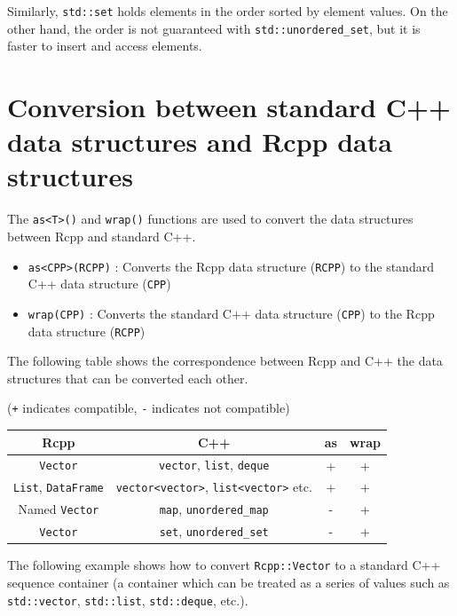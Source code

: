 \documentclass[
]{book}
\providecommand{\tightlist}{%
  \setlength{\itemsep}{0pt}\setlength{\parskip}{0pt}}
\begin{document}
Similarly, \texttt{std::set} holds elements in the order sorted by element values. On the other hand, the order is not guaranteed with \texttt{std::unordered\_set}, but it is faster to insert and access elements.

\hypertarget{conversion-between-standard-c-data-structures-and-rcpp-data-structures}{%
\section{Conversion between standard C++ data structures and Rcpp data structures}\label{conversion-between-standard-c-data-structures-and-rcpp-data-structures}}

The \texttt{as\textless{}T\textgreater{}()} and \texttt{wrap()} functions are used to convert the data structures between Rcpp and standard C++.

\begin{itemize}
\tightlist
\item
  \texttt{as\textless{}CPP\textgreater{}(RCPP)} : Converts the Rcpp data structure (\texttt{RCPP}) to the standard C++ data structure (\texttt{CPP})
\item
  \texttt{wrap(CPP)} : Converts the standard C++ data structure (\texttt{CPP}) to the Rcpp data structure (\texttt{RCPP})
\end{itemize}

The following table shows the correspondence between Rcpp and C++ the data structures that can be converted each other.

(\texttt{+} indicates compatible, \texttt{-} indicates not compatible)

\begin{longtable}[]{@{}cccc@{}}
\toprule
Rcpp & C++ & as & wrap\tabularnewline
\midrule
\endhead
\texttt{Vector} & \texttt{vector}, \texttt{list}, \texttt{deque} & + & +\tabularnewline
\texttt{List}, \texttt{DataFrame} & \texttt{vector\textless{}vector\textgreater{}}, \texttt{list\textless{}vector\textgreater{}} etc. & + & +\tabularnewline
Named \texttt{Vector} & \texttt{map}, \texttt{unordered\_map} & - & +\tabularnewline
\texttt{Vector} & \texttt{set}, \texttt{unordered\_set} & - & +\tabularnewline
\bottomrule
\end{longtable}

The following example shows how to convert \texttt{Rcpp::Vector} to a standard C++ sequence container (a container which can be treated as a series of values such as \texttt{std::vector}, \texttt{std::list}, \texttt{std::deque}, etc.).
\end{document}
